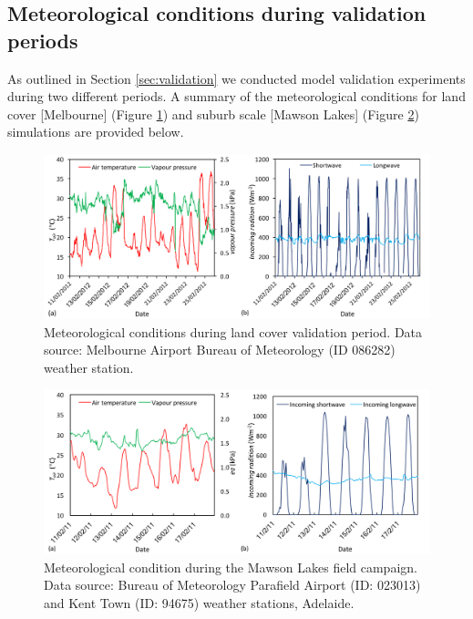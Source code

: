 \documentclass[gmd, manuscript]{copernicus}
\begin{document}
\subsection{Meteorological conditions during validation periods}

As outlined in Section \ref{sec:validation} we conducted model validation experiments during two different periods. A summary of the meteorological conditions for  land cover [Melbourne] (Figure \ref{fig:met}) and suburb scale [Mawson Lakes] (Figure \ref{fig:met3}) simulations are provided below.

\begin{figure}[!htbp]

\includegraphics[width=1\textwidth,keepaspectratio]{figure11.png}

 \caption{Meteorological conditions during land cover validation period. Data source: Melbourne Airport Bureau of Meteorology (ID 086282) weather station.} \label{fig:met}
\end{figure}

\begin{figure}[!htbp]

\includegraphics[width=1\textwidth,keepaspectratio]{figure12.png}

 \caption{Meteorological condition during the Mawson Lakes field campaign. Data source: Bureau of Meteorology Parafield Airport (ID: 023013) and Kent Town (ID: 94675) weather stations, Adelaide.} \label{fig:met3}
\end{figure}
\end{document}
